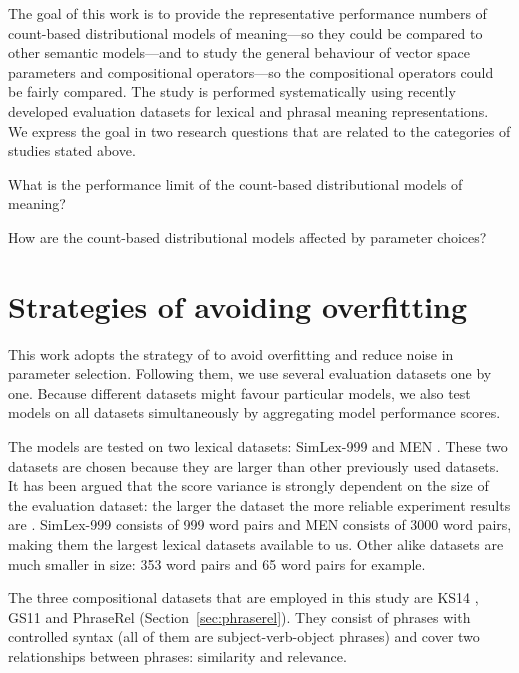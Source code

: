 The goal of this work is to provide the representative performance numbers of count-based distributional models of meaning---so they could be compared to other semantic models---and to study the general behaviour of vector space parameters and compositional operators---so the compositional operators could be fairly compared. The study is performed systematically using recently developed evaluation datasets for lexical and phrasal meaning representations. We express the goal in two research questions that are related to the categories of studies stated above.
\begin{compactitem}
\item What is the performance limit of the count-based distributional models of meaning?
\item How are the count-based distributional models affected by parameter choices?
\end{compactitem}

\section{Strategies of avoiding overfitting}
\label{sec:avoiding-overfitting}

This work adopts the strategy of  to avoid overfitting and reduce noise in parameter selection. Following them, we use several evaluation datasets one by one. Because different datasets might favour particular models, we also test models on all datasets simultaneously by aggregating model performance scores.

The models are tested on two lexical datasets: SimLex-999 \cite{hill2014simlex} and MEN \cite{Bruni:2014:MDS:2655713.2655714}. These two datasets are chosen because they are larger than other previously used datasets. It has been argued that the score variance is strongly dependent on the size of the evaluation dataset: the larger the dataset the more reliable experiment results are \cite{W16-2502}. SimLex-999 consists of 999 word pairs and MEN consists of 3000 word pairs, making them the largest lexical datasets available to us. Other alike datasets are much smaller in size: 353 word pairs \cite{2002:PSC:503104.503110} and 65 word pairs \cite{Rubenstein:1965:CCS:365628.365657} for example.
% 

The three compositional datasets that are employed in this study are KS14 \cite{kartsadrqpl2014}, GS11 \cite{Grefenstette:2011:ESC:2145432.2145580} and PhraseRel (Section~\ref{sec:phraserel}). They consist of phrases with controlled syntax (all of them are subject-verb-object phrases) and cover two relationships between phrases: similarity and relevance.

